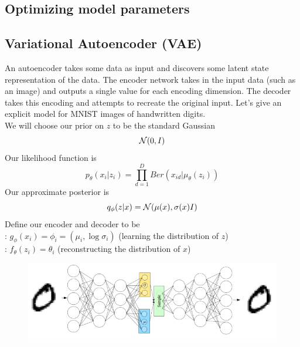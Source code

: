 \documentclass[11pt]{article}
\begin{document}
\subsection{Optimizing model parameters}

\subsection{Variational Autoencoder (VAE)}
An autoencoder takes some data as input and discovers some latent state representation of the data. The encoder network takes in the input data (such as an image) and outputs a single value for each encoding dimension. The decoder takes this encoding and attempts to recreate the original input. 
Let's give an explicit model for MNIST images of handwritten digits.\\
We will choose our prior on $z$ to be the standard Gaussian $$\mathcal{N}(0,I)$$
Our likelihood function is
$$p_{\theta}(x_i|z_i) = \prod_{d=1}^D Ber(x_{id}|\mu_{\theta}(z_i))$$
Our approximate posterior is
$$q_\phi(z|x) = \mathcal{N}(\mu(x), \sigma(x)I)$$
Define our encoder and decoder to be\\
: $g_\phi(x_i) = \phi_i = (\mu_i, \log \sigma_i)$ (learning the distribution of $z$)\\
: $f_\theta(z_i) = \theta_i$ (reconstructing the distribution of $x$)
\begin{figure}[H]
	\centering
	\includegraphics[scale=0.6]{p12.png}
\end{figure}
\end{document}
